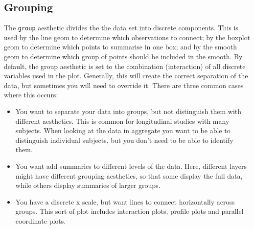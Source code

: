 % 


\subsection{Grouping}
\label{sub:grouping}

The {\tt group} aesthetic divides the the data set into discrete components.   This is used by the line geom to determine which observations to connect; by the boxplot geom to determine which points to summarise in one box; and by the smooth geom to determine which group of points should be included in the smooth. By default, the group aesthetic is set to the combination (interaction) of all discrete variables used in the plot.  Generally, this will create the correct separation of the data, but sometimes you will need to override it.  There are three common cases where this occurs:

\begin{itemize}
  \item You want to separate your data into groups, but not distinguish them with different aesthetics.  This is common for longitudinal studies with many subjects.  When looking at the data in aggregate you want to be able to distinguish individual subjects, but you don't need to be able to identify them.
  
  \item You want add summaries to different levels of the data. Here, different layers might have different grouping aesthetics, so that some display the full data, while others display summaries of larger groups.

  \item You have a discrete x scale, but want lines to connect horizontally across groups.  This sort of plot includes interaction plots, profile plots and parallel coordinate plots.  
  
\end{itemize}

